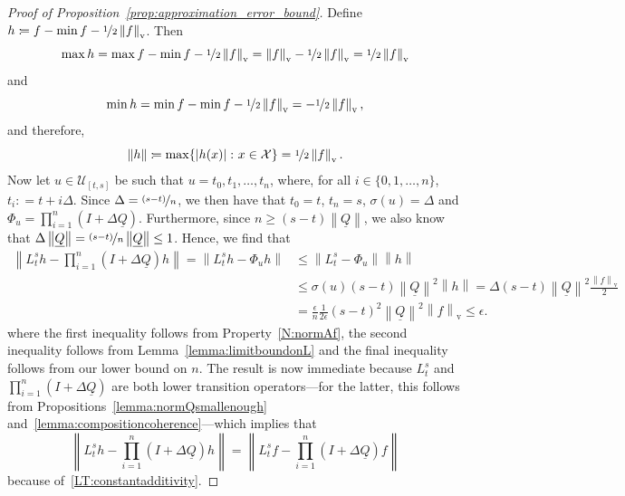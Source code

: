 \documentclass[10pt,a4paper]{paper}
\theoremstyle{definition}
\newcommand{\states}{\mathcal{X}}
\newcommand{\lrate}{\underline{Q}}
\newcommand{\norm}[1]{\left\lVert #1 \right\rVert}
\newcommand{\abs}[1]{\left\vert #1 \right\vert}
\newcommand{\coloneqq}{:\!=}
\begin{document}
\begin{proof}[Proof of Proposition~\ref{prop:approximation_error_bound}]
Define $h\coloneqq f-\min f-\nicefrac{1}{2}\norm{f}_\mathrm{v}$. Then
\begin{equation*}
\max h
=\max f-\min f-\nicefrac{1}{2}\norm{f}_\mathrm{v}
=\norm{f}_\mathrm{v}-\nicefrac{1}{2}\norm{f}_\mathrm{v}
=\nicefrac{1}{2}\norm{f}_\mathrm{v}
\end{equation*}
and
\begin{equation*}
\min h
=\min f-\min f-\nicefrac{1}{2}\norm{f}_\mathrm{v}
=-\nicefrac{1}{2}\norm{f}_\mathrm{v},
\end{equation*}
and therefore, 
\begin{equation*}
\norm{h}
\coloneqq
\max\{\abs{h(x)}\colon x\in\states\}
=\nicefrac{1}{2}\norm{f}_\mathrm{v}.
\end{equation*}
Now let $u\in\mathcal{U}_{[t,s]}$ be such that $u=t_0,t_1,\ldots,t_n$, where, for all $i\in\{0,1,\ldots,n\}$, $t_i\coloneqq t + i\Delta$. Since $\Delta=\nicefrac{(s-t)}{n}$, we then have that $t_0=t$, $t_n=s$, $\sigma(u)=\Delta$ and $\Phi_u= \prod_{i=1}^n(I+\Delta\lrate)$.
Furthermore, since $n\geq (s-t)\norm{\lrate}$, we also know that $\Delta\norm{\lrate}=\nicefrac{(s-t)}{n}\norm{\lrate}\leq 1$. Hence, we find that
\begin{align*}
\norm{L_t^sh - \prod_{i=1}^n(I+\Delta\lrate)h} = \norm{L_t^sh - \Phi_uh} &\leq \norm{L_t^s - \Phi_u}\norm{h} \\[-8pt]
 &\leq \sigma(u)(s-t)\norm{\lrate}^2\norm{h} = \Delta(s-t)\norm{\lrate}^2\frac{\norm{f}_\mathrm{v}}{2}\\
 &= 
\frac{\epsilon}{n}\frac{1}{2\epsilon}(s-t)^2\norm{\lrate}^2\norm{f}_\mathrm{v}
 \leq \epsilon.
\end{align*}
where the first inequality follows from Property~\ref{N:normAf}, the second inequality follows from Lemma~\ref{lemma:limitboundonL} and the final inequality follows from our lower bound on $n$. The result is now immediate because $L_t^s$ and $\prod_{i=1}^n(I+\Delta\lrate)$ are both lower transition operators---for the latter, this follows from Propositions~\ref{lemma:normQsmallenough} and~\ref{lemma:compositioncoherence}---which implies that
\begin{equation*}
\norm{L_t^sh - \prod_{i=1}^n(I+\Delta\lrate)h}
=
\norm{L_t^sf - \prod_{i=1}^n(I+\Delta\lrate)f}
\end{equation*}
because of~\ref{LT:constantadditivity}.
\end{proof}
\end{document}
